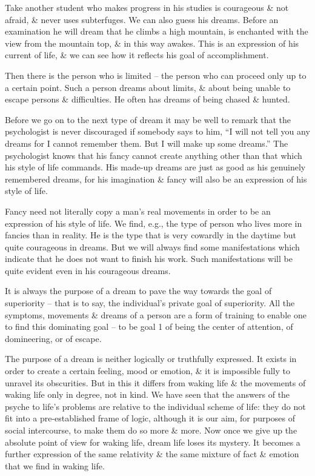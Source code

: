 \documentclass{article}
\begin{document}
Take another student who makes progress in his studies is courageous \& not afraid, \& never uses subterfuges. We can also guess his dreams. Before an examination he will dream that he climbs a high mountain, is enchanted with the view from the mountain top, \& in this way awakes. This is an expression of his current of life, \& we can see how it reflects his goal of accomplishment.

Then there is the person who is limited -- the person who can proceed only up to a certain point. Such a person dreams about limits, \& about being unable to escape persons \& difficulties. He often has dreams of being chased \& hunted.

Before we go on to the next type of dream it may be well to remark that the psychologist is never discouraged if somebody says to him, ``I will not tell you any dreams for I cannot remember them. But I will make up some dreams.'' The psychologist knows that his fancy cannot create anything other than that which his style of life commands. His made-up dreams are just as good as his genuinely remembered dreams, for his imagination \& fancy will also be an expression of his style of life.

Fancy need not literally copy a man's real movements in order to be an expression of his style of life. We find, e.g., the type of person who lives more in fancies than in reality. He is the type that is very cowardly in the daytime but quite courageous in dreams. But we will always find some manifestations which indicate that he does not want to finish his work. Such manifestations will be quite evident even in his courageous dreams.

It is always the purpose of a dream to pave the way towards the goal of superiority -- that is to say, the individual's private goal of superiority. All the symptoms, movements \& dreams of a person are a form of training to enable one to find this dominating goal -- to be goal 1 of being the center of attention, of domineering, or of escape.

The purpose of a dream is neither logically or truthfully expressed. It exists in order to create a certain feeling, mood or emotion, \& it is impossible fully to unravel its obscurities. But in this it differs from waking life \& the movements of waking life only in degree, not in kind. We have seen that the answers of the psyche to life's problems are relative to the individual scheme of life: they do not fit into a pre-established frame of logic, although it is our aim, for purposes of social intercourse, to make them do so more \& more. Now once we give up the absolute point of view for waking life, dream life loses its mystery. It becomes a further expression of the same relativity \& the same mixture of fact \& emotion that we find in waking life.
\end{document}
